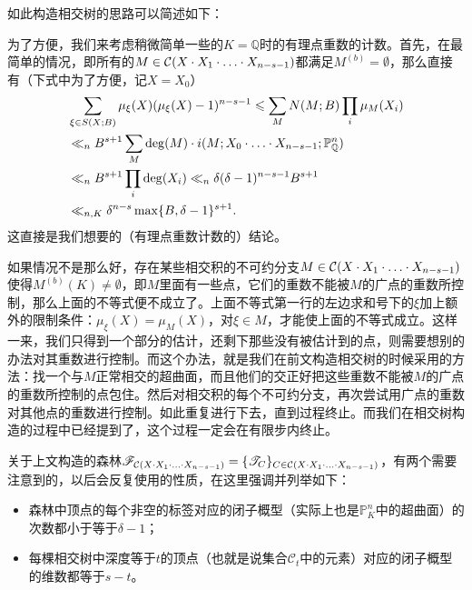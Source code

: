 \begin{remark} \label{philosophy of intersection forest}
如此构造相交树的思路可以简述如下：

为了方便，我们来考虑稍微简单一些的$K = \mathbb{Q}$时的有理点重数的计数。首先，在最简单的情况，即所有的$M \in \mathcal{C}(X\cdot X_1\cdot\ldots\cdot X_{n-s-1})$都满足$M^{(b)} = \emptyset$，那么直接有（下式中为了方便，记$X = X_0$）
\begin{align}
& \sum\limits_{\xi \in S(X;B)} \mu_{\xi}(X)(\mu_{\xi}(X)-1)^{n-s-1} \leqslant \sum\limits_M N(M;B) \prod\limits_i \mu_{M}(X_i) \\
& \ll_{n} B^{s+1} \sum\limits_M \deg(M) \cdot i(M; X_0\cdot\ldots\cdot X_{n-s-1}; \mathbb{P}^n_{\mathbb{Q}}) \\
& \ll_{n} B^{s+1} \prod\limits_i \deg(X_i) \ll_{n} \delta(\delta-1)^{n-s-1} B^{s+1} \\
& \ll_{n,K} \delta^{n-s} \max\{B, \delta-1\}^{s+1}.
\end{align}
这直接是我们想要的（有理点重数计数的）结论。

如果情况不是那么好，存在某些相交积的不可约分支$M \in \mathcal{C}(X\cdot X_1\cdot\ldots\cdot X_{n-s-1})$使得$M^{(b)}(K) \neq \emptyset$，即$M$里面有一些点，它们的重数不能被$M$的广点的重数所控制，那么上面的不等式便不成立了。上面不等式第一行的左边求和号下的$\xi$加上额外的限制条件：$\mu_{\xi}(X) = \mu_M(X)$，对$\xi \in M$，才能使上面的不等式成立。这样一来，我们只得到一个部分的估计，还剩下那些没有被估计到的点，则需要想别的办法对其重数进行控制。而这个办法，就是我们在前文构造相交树的时候采用的方法：找一个与$M$正常相交的超曲面，而且他们的交正好把这些重数不能被$M$的广点的重数所控制的点包住。然后对相交积的每个不可约分支，再次尝试用广点的重数对其他点的重数进行控制。如此重复进行下去，直到过程终止。而我们在相交树构造的过程中已经提到了，这个过程一定会在有限步内终止。
\end{remark}

\begin{remark} \label{simple facts on forest}
关于上文构造的森林$\mathscr{F}_{\mathcal C(X\cdot X_{1}\cdot\ldots\cdot X_{n-s-1})} = \{\mathscr T_C\}_{C\in\mathcal C(X\cdot X_{1}\cdot\ldots\cdot X_{n-s-1})}$，有两个需要注意到的，以后会反复使用的性质，在这里强调并列举如下：
\begin{itemize}
\item 森林中顶点的每个非空的标签对应的闭子概型（实际上也是$\mathbb{P}_K^n$中的超曲面）的次数都小于等于$\delta-1$；
\item 每棵相交树中深度等于$t$的顶点（也就是说集合$\mathcal{C}_t$中的元素）对应的闭子概型的维数都等于$s-t$。
\end{itemize}
\end{remark}


